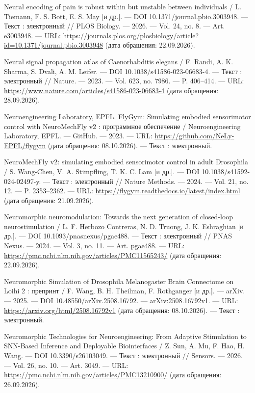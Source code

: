 \begin{list}{}{\setlength{\leftmargin}{10mm}\setlength{\labelwidth}{8mm}\setlength{\labelsep}{2mm}\setlength{\itemsep}{0pt}\setlength{\parsep}{0pt}\setlength{\topsep}{0pt}}
\item[198.] Neural encoding of pain is robust within but unstable between individuals / L. Tiemann, F. S. Bott, E. S. May [и др.]. — DOI 10.1371/journal.pbio.3003948. — Текст : электронный // PLOS Biology. — 2026. — Vol. 24, no. 8. — Art. e3003948. — URL: \url{https://journals.plos.org/plosbiology/article?id=10.1371/journal.pbio.3003948} (дата обращения: 22.09.2026).
\item[199.] Neural signal propagation atlas of Caenorhabditis elegans / F. Randi, A. K. Sharma, S. Dvali, A. M. Leifer. — DOI 10.1038/s41586-023-06683-4. — Текст : электронный // Nature. — 2023. — Vol. 623, no. 7986. — P. 406–414. — URL: \url{https://www.nature.com/articles/s41586-023-06683-4} (дата обращения: 28.09.2026).
\item[200.] Neuroengineering Laboratory, EPFL. FlyGym: Simulating embodied sensorimotor control with NeuroMechFly v2 : программное обеспечение / Neuroengineering Laboratory, EPFL. — GitHub. — 2023. — URL: \url{https://github.com/NeLy-EPFL/flygym} (дата обращения: 08.10.2026). — Текст : электронный.
\item[201.] NeuroMechFly v2: simulating embodied sensorimotor control in adult Drosophila / S. Wang-Chen, V. A. Stimpfling, T. K. C. Lam [и др.]. — DOI 10.1038/s41592-024-02497-y. — Текст : электронный // Nature Methods. — 2024. — Vol. 21, no. 12. — P. 2353–2362. — URL: \url{https://flygym.readthedocs.io/latest/index.html} (дата обращения: 21.09.2026).
\item[202.] Neuromorphic neuromodulation: Towards the next generation of closed-loop neurostimulation / L. F. Herbozo Contreras, N. D. Truong, J. K. Eshraghian [и др.]. — DOI 10.1093/pnasnexus/pgae488. — Текст : электронный // PNAS Nexus. — 2024. — Vol. 3, no. 11. — Art. pgae488. — URL: \url{https://pmc.ncbi.nlm.nih.gov/articles/PMC11565243/} (дата обращения: 22.09.2026).
\item[203.] Neuromorphic Simulation of Drosophila Melanogaster Brain Connectome on Loihi 2 : препринт / F. Wang, B. H. Theilman, F. Rothganger [и др.]. — arXiv. — 2025. — DOI 10.48550/arXiv.2508.16792. — arXiv:2508.16792v1. — URL: \url{https://arxiv.org/html/2508.16792v1} (дата обращения: 08.10.2026). — Текст : электронный.
\item[204.] Neuromorphic Technologies for Neuroengineering: From Adaptive Stimulation to SNN-Based Inference and Deployable Biointerfaces / Z. Sun, A. Mu, F. Hao, H. Wang. — DOI 10.3390/s26103049. — Текст : электронный // Sensors. — 2026. — Vol. 26, no. 10. — Art. 3049. — URL: \url{https://pmc.ncbi.nlm.nih.gov/articles/PMC13210900/} (дата обращения: 26.09.2026).

\end{list}
